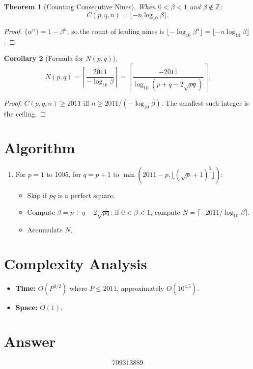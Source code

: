 \documentclass[12pt]{article}
\newtheorem{theorem}{Theorem}
\newtheorem{corollary}[theorem]{Corollary}
\begin{document}
\begin{theorem}[Counting Consecutive Nines]
When $0 < \beta < 1$ and $\beta \notin \mathbb{Z}$:
\[
    C(p,q,n) = \lfloor -n\log_{10}\beta \rfloor.
\]
\end{theorem}

\begin{proof}
$\{\alpha^n\} = 1 - \beta^n$, so the count of leading nines is $\lfloor -\log_{10}\beta^n \rfloor = \lfloor -n\log_{10}\beta \rfloor$.
\end{proof}

\begin{corollary}[Formula for $N(p,q)$]
\[
    N(p,q) = \left\lceil \frac{2011}{-\log_{10}\beta} \right\rceil = \left\lceil \frac{-2011}{\log_{10}(p+q-2\sqrt{pq})} \right\rceil.
\]
\end{corollary}

\begin{proof}
$C(p,q,n) \ge 2011$ iff $n \ge 2011/(-\log_{10}\beta)$. The smallest such integer is the ceiling.
\end{proof}

\section{Algorithm}

\begin{enumerate}
    \item For $p = 1$ to 1005, for $q = p+1$ to $\min(2011-p, \lfloor(\sqrt{p}+1)^2\rfloor)$:
    \begin{itemize}
        \item Skip if $pq$ is a perfect square.
        \item Compute $\beta = p+q-2\sqrt{pq}$; if $0 < \beta < 1$, compute $N = \lceil -2011/\log_{10}\beta \rceil$.
        \item Accumulate $N$.
    \end{itemize}
\end{enumerate}

\section{Complexity Analysis}

\begin{itemize}
    \item \textbf{Time:} $O(P^{3/2})$ where $P \le 2011$, approximately $O(10^{4.5})$.
    \item \textbf{Space:} $O(1)$.
\end{itemize}

\section{Answer}

\[
\boxed{709313889}
\]
\end{document}
